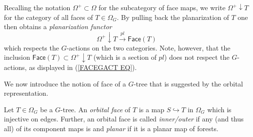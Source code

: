 \documentclass[a4paper,10pt
,draft
]{article}%
\begin{document}
\begin{remark}\label{PLFUNCTOR REM}
	Recalling the notation $\Omega^+ \subset \Omega$
	for the subcategory of face maps,
	we write $\Omega^+ \downarrow T$ for the category of all faces of $T \in \Omega_G$.
	By pulling back the planarization of $T$ one then obtains a \textit{planarization functor}
	\[
		\Omega^+ \downarrow T \xrightarrow{pl} \mathsf{Face}(T)
	\]
which respects the $G$-actions on the two categories.
	Note, however, that the inclusion 
	$\mathsf{Face}(T) \subset \Omega^+ \downarrow T$ (which is a section of $pl$) does not respect the $G$-actions, as displayed in (\ref{FACEGACT EQ}).
\end{remark}

We now introduce the notion of face of a $G$-tree that is suggested by the orbital representation.

\begin{definition}\label{ORBFACE DEF}
	Let $T \in \Omega_G$ be a $G$-tree.
	An \textit{orbital face} of $T$ is a map 
	$S \hookrightarrow T$ in $\Omega_G$ which is injective on edges. Further, an orbital face is called
	\textit{inner/outer} if any (and thus all) of its  component maps is and \textit{planar} if it is a planar map of forests.
\end{definition}
\end{document}
